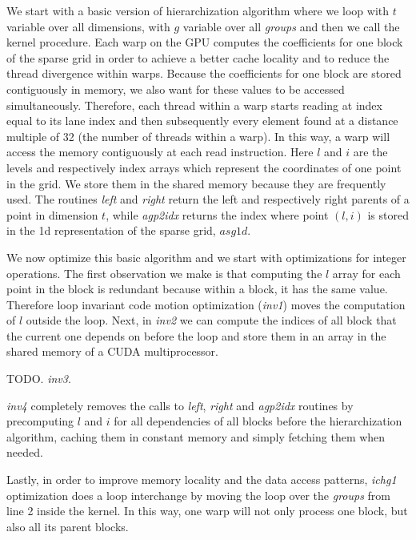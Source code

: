 We start with a basic version of hierarchization algorithm where we loop with
$t$ variable over all dimensions, with $g$ variable over all \textit{groups}
and then we call the kernel procedure. Each warp on the GPU computes the
coefficients for one block of the sparse grid in order to achieve a better cache
locality and to reduce the thread divergence within warps. Because the
coefficients for one block are stored contiguously in memory, we also want for
these values to be accessed simultaneously. Therefore, each thread within a warp
starts reading at index equal to its lane index and then subsequently every
element found at a distance multiple of 32 (the number of threads within a
warp). In this way, a warp will access the memory contiguously at each read
instruction. Here $l$ and $i$ are the levels and respectively index arrays
which represent the coordinates of one point in the grid. We store them in the
shared memory because they are frequently used. The routines \textit{left} and
\textit{right} return the left and respectively right parents of a point in
dimension $t$, while \textit{agp2idx} returns the index where point $(l, i)$ is
stored in the 1d representation of the sparse grid, $asg1d$.

We now optimize this basic algorithm and we start with optimizations for integer
operations. The first observation we make is that computing the $l$ array for
each point in the block is redundant because within a block, it has the same
value. Therefore loop invariant code motion optimization (\textit{inv1}) moves
the computation of $l$ outside the loop. Next, in \textit{inv2} we can compute
the indices of all block that the current one depends on before the loop and
store them in an array in the shared memory of a CUDA multiprocessor.

TODO. \textit{inv3}.

\textit{inv4} completely removes the calls to \textit{left}, \textit{right} and
\textit{agp2idx} routines by precomputing $l$ and $i$ for all dependencies of
all blocks before the hierarchization algorithm, caching them in constant memory
and simply fetching them when needed.

Lastly, in order to improve memory locality and the data access patterns,
\textit{ichg1} optimization does a loop interchange by moving the loop over the
\textit{groups} from line 2 inside the kernel. In this way, one warp will not
only process one block, but also all its parent blocks.

